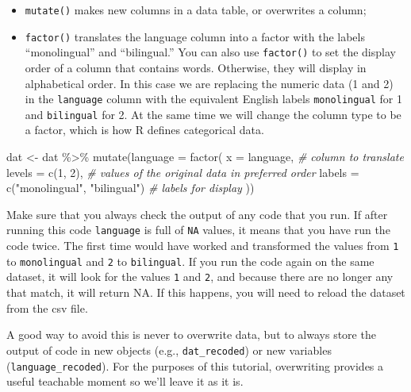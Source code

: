 \documentclass[
  english,
  doc,floatsintext]{apa6}
\newenvironment{Shaded}{\begin{snugshade}}{\end{snugshade}}
\newcommand{\AttributeTok}[1]{\textcolor[rgb]{0.77,0.63,0.00}{#1}}
\newcommand{\CommentTok}[1]{\textcolor[rgb]{0.56,0.35,0.01}{\textit{#1}}}
\newcommand{\DecValTok}[1]{\textcolor[rgb]{0.00,0.00,0.81}{#1}}
\newcommand{\FunctionTok}[1]{\textcolor[rgb]{0.00,0.00,0.00}{#1}}
\newcommand{\NormalTok}[1]{#1}
\newcommand{\OtherTok}[1]{\textcolor[rgb]{0.56,0.35,0.01}{#1}}
\newcommand{\SpecialCharTok}[1]{\textcolor[rgb]{0.00,0.00,0.00}{#1}}
\newcommand{\StringTok}[1]{\textcolor[rgb]{0.31,0.60,0.02}{#1}}
\providecommand{\tightlist}{%
  \setlength{\itemsep}{0pt}\setlength{\parskip}{0pt}}
\begin{document}
\begin{itemize}
\tightlist
\item
  \texttt{mutate()} makes new columns in a data table, or overwrites a column;
\item
  \texttt{factor()} translates the language column into a factor with the labels ``monolingual'' and ``bilingual.'' You can also use \texttt{factor()} to set the display order of a column that contains words. Otherwise, they will display in alphabetical order. In this case we are replacing the numeric data (1 and 2) in the \texttt{language} column with the equivalent English labels \texttt{monolingual} for 1 and \texttt{bilingual} for 2. At the same time we will change the column type to be a factor, which is how R defines categorical data.
\end{itemize}

\begin{Shaded}
\begin{Highlighting}[]
\NormalTok{dat }\OtherTok{\textless{}{-}}\NormalTok{ dat }\SpecialCharTok{\%\textgreater{}\%}
  \FunctionTok{mutate}\NormalTok{(}\AttributeTok{language =} \FunctionTok{factor}\NormalTok{(}
    \AttributeTok{x =}\NormalTok{ language, }\CommentTok{\# column to translate}
    \AttributeTok{levels =} \FunctionTok{c}\NormalTok{(}\DecValTok{1}\NormalTok{, }\DecValTok{2}\NormalTok{), }\CommentTok{\# values of the original data in preferred order}
    \AttributeTok{labels =} \FunctionTok{c}\NormalTok{(}\StringTok{"monolingual"}\NormalTok{, }\StringTok{"bilingual"}\NormalTok{) }\CommentTok{\# labels for display}
\NormalTok{  ))}
\end{Highlighting}
\end{Shaded}

Make sure that you always check the output of any code that you run. If after running this code \texttt{language} is full of \texttt{NA} values, it means that you have run the code twice. The first time would have worked and transformed the values from \texttt{1} to \texttt{monolingual} and \texttt{2} to \texttt{bilingual}. If you run the code again on the same dataset, it will look for the values \texttt{1} and \texttt{2}, and because there are no longer any that match, it will return NA. If this happens, you will need to reload the dataset from the csv file.

A good way to avoid this is never to overwrite data, but to always store the output of code in new objects (e.g., \texttt{dat\_recoded}) or new variables (\texttt{language\_recoded}). For the purposes of this tutorial, overwriting provides a useful teachable moment so we'll leave it as it is.
\end{document}
